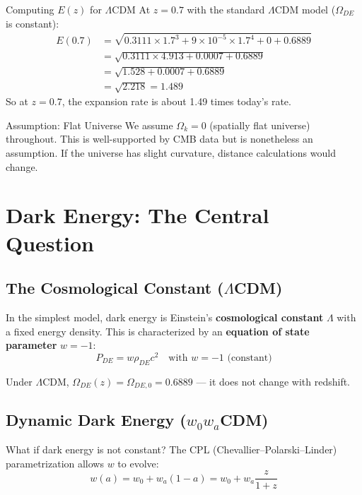 \documentclass[11pt,a4paper]{article}
\newcommand{\LCDM}{$\Lambda$CDM}
\begin{document}
\begin{examplebox}{Computing $E(z)$ for \LCDM}
At $z = 0.7$ with the standard \LCDM{} model ($\Omega_{DE}$ is constant):
\begin{align}
E(0.7) &= \sqrt{0.3111 \times 1.7^3 + 9\times10^{-5} \times 1.7^4 + 0 + 0.6889} \\
&= \sqrt{0.3111 \times 4.913 + 0.0007 + 0.6889} \\
&= \sqrt{1.528 + 0.0007 + 0.6889} \\
&= \sqrt{2.218} = 1.489
\end{align}
So at $z = 0.7$, the expansion rate is about 1.49 times today's rate.
\end{examplebox}

\begin{warningbox}{Assumption: Flat Universe}
We assume $\Omega_k = 0$ (spatially flat universe) throughout. This is well-supported by CMB data but is nonetheless an assumption. If the universe has slight curvature, distance calculations would change.
\end{warningbox}

\section{Dark Energy: The Central Question}
\label{sec:darkenergy}

\subsection{The Cosmological Constant (\LCDM)}

In the simplest model, dark energy is Einstein's \textbf{cosmological constant} $\Lambda$ with a fixed energy density. This is characterized by an \textbf{equation of state parameter} $w = -1$:
\begin{equation}
P_{DE} = w \rho_{DE} c^2 \quad \text{with } w = -1 \text{ (constant)}
\end{equation}

Under \LCDM, $\Omega_{DE}(z) = \Omega_{DE,0} = 0.6889$ --- it does not change with redshift.

\subsection{Dynamic Dark Energy ($w_0 w_a$CDM)}

What if dark energy is not constant? The CPL (Chevallier--Polarski--Linder) parametrization allows $w$ to evolve:
\begin{equation}
\boxed{w(a) = w_0 + w_a(1 - a) = w_0 + w_a \frac{z}{1+z}}
\label{eq:cpl}
\end{equation}
\end{document}
